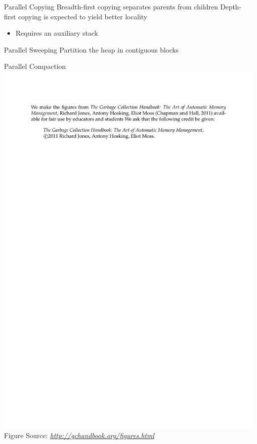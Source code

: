 \documentclass[
14pt,
aspectratio=169,
usenames,
dvipsnames,
x11names]{beamer}
\newcommand{\src}[1]{\scriptsize Figure Source: \textit{#1}}
\begin{document}
\begin{frame}{Parallel Copying}
  Breadth-first copying \alert{separates parents from children}
  \vfill
  Depth-first copying is expected to yield \alert{better locality}
  \begin{itemize}
  \item Requires an auxiliary stack
  \end{itemize}
\end{frame}

\begin{frame}{Parallel Sweeping}
  \centering
  Partition the heap in contiguous blocks
\end{frame}

\begin{frame}{Parallel Compaction}
  \centering
  \includegraphics[page=72,trim=4cm 9.5cm 4cm 10.5cm,height=.7\textheight]{gchandbookfigures}\\
  \src{\url{http://gchandbook.org/figures.html}}
\end{frame}
\end{document}

